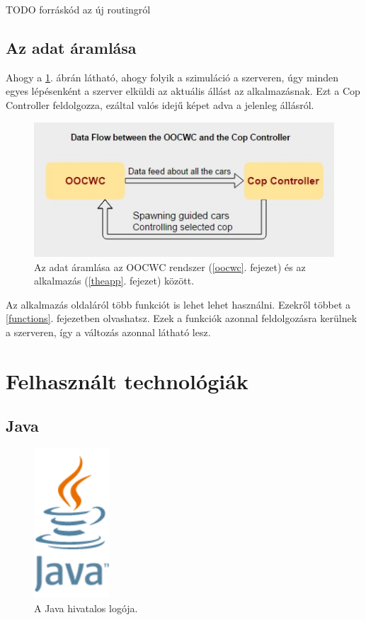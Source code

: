 \documentclass[a4paper,12pt]{report}
\begin{document}
TODO forráskód az új routingról

\section{Az adat áramlása}
\label{dataflow}

Ahogy a \ref{dataflowpicture}. ábrán látható, ahogy folyik a szimuláció a szerveren, úgy minden egyes lépésenként a szerver elküldi az aktuális állást az alkalmazásnak. Ezt a Cop Controller feldolgozza, ezáltal valós idejű képet adva a jelenleg állásról.

\begin{figure}[h]
\centerline{
\includegraphics[width=4.5in]{img/dataflow}}
\caption{Az adat áramlása az OOCWC rendszer (\ref{oocwc}. fejezet) és az alkalmazás (\ref{theapp}. fejezet) között.}
\label{dataflowpicture}
\end{figure}

\vspace{2mm}
Az alkalmazás oldaláról több funkciót is lehet lehet használni. Ezekről többet a \ref{functions}. fejezetben olvashatsz. Ezek a funkciók azonnal feldolgozásra kerülnek a szerveren, így a változás azonnal látható lesz.

\newpage
\chapter{Felhasznált technológiák}
\label{technologies}

\section{Java}
\label{java}

\begin{figure}
\centerline{
\includegraphics[width=1.1in]{img/javalogo}}
\caption{A Java hivatalos logója.}
\label{javalogo}
\end{figure}
\end{document}
